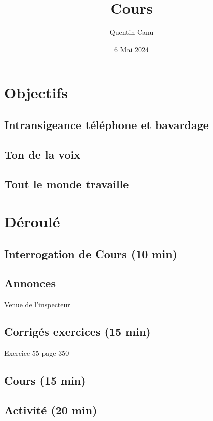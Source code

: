 \documentclass{article}
\title{Cours}
\date{6 Mai 2024}
\author{Quentin Canu}
\begin{document}
\maketitle 
\section{Objectifs}
\subsection{Intransigeance téléphone et bavardage}
\subsection{Ton de la voix}
\subsection{Tout le monde travaille}
\section{Déroulé}
\subsection{Interrogation de Cours (10 min)}
\subsection{Annonces}
Venue de l'inspecteur
\subsection{Corrigés exercices (15 min)}
Exercice 55 page 350
\subsection{Cours (15 min)}
\subsection{Activité (20 min)}
\end{document}
